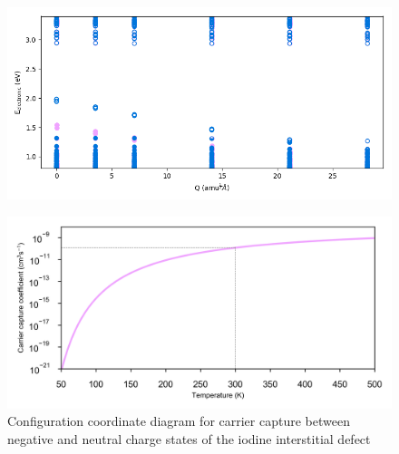  

\begin{figure}[h!]   
\centering
  \includegraphics[width=1.0\columnwidth]{figures/ch6/eigs.png}
  \caption[ ]{}
\label{eigenvalues}
\end{figure}


\begin{figure}[h!]   
\centering
  \includegraphics[width=1.0\columnwidth]{figures/ch6/carrier_capture_rate.png}
  \caption[Rate of electron capture at the ]{Configuration coordinate diagram for carrier capture between negative and neutral charge states of the iodine interstitial defect}
\label{carrier_capture_rate}
\end{figure}






